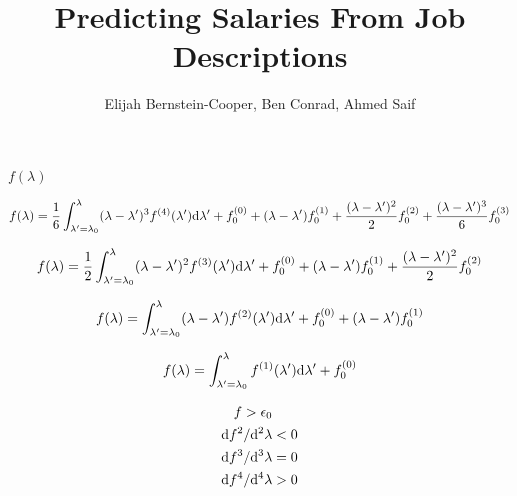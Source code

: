 \documentclass[12pt]{article}
\begin{document}
\title{Predicting Salaries From Job Descriptions}

\author{
Elijah Bernstein-Cooper, Ben Conrad, Ahmed Saif
}
\maketitle



    $f(\lambda)$

    \begin{equation}
        f(\lambda) = \frac{1}{6}\int_{\lambda^\prime=\lambda_0}^\lambda
                       (\lambda - \lambda^\prime)^3 f^{(4)}(\lambda^\prime){\rm
                       d}\lambda^\prime + f^{(0)}_0 + 
                       (\lambda - \lambda^\prime) f^{(1)}_0 + 
                       \frac{(\lambda - \lambda^\prime)^2}{2} f^{(2)}_0 + 
                       \frac{(\lambda - \lambda^\prime)^3}{6} f^{(3)}_0
    \end{equation}
    
    \begin{equation}
        f(\lambda) = \frac{1}{2}\int_{\lambda^\prime=\lambda_0}^\lambda
                       (\lambda - \lambda^\prime)^2 f^{(3)}(\lambda^\prime){\rm
                       d}\lambda^\prime + f^{(0)}_0 + 
                       (\lambda - \lambda^\prime) f^{(1)}_0 + 
                       \frac{(\lambda - \lambda^\prime)^2}{2} f^{(2)}_0
    \end{equation}
    
    \begin{equation}
        f(\lambda) = \int_{\lambda^\prime=\lambda_0}^\lambda
                       (\lambda - \lambda^\prime) f^{(2)}(\lambda^\prime){\rm
                       d}\lambda^\prime + f^{(0)}_0 + 
                       (\lambda - \lambda^\prime) f^{(1)}_0 
    \end{equation}
    
    \begin{equation}
        f(\lambda) = \int_{\lambda^\prime=\lambda_0}^\lambda
                       f^{(1)}(\lambda^\prime){\rm
                       d}\lambda^\prime + f^{(0)}_0
    \end{equation}

        \begin{align*}
            f > \epsilon_0 & \\
            {\rm d}f^2/{\rm d^2}\lambda & < 0 \\
            {\rm d}f^3/{\rm d^3}\lambda & = 0 \\
            {\rm d}f^4/{\rm d^4}\lambda & > 0
        \end{align*}
\end{document}
